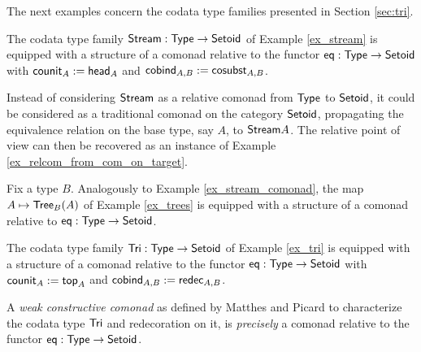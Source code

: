 \documentclass[a4paper,USenglish]{lipics}
\begin{document}
\noindent
The next examples concern the codata type families presented in Section \ref{sec:tri}.

\begin{example}[Streams]\label{ex_stream_comonad}
  The codata type family $\mathsf{Stream} : \mathsf{Type} \to \mathsf{Setoid}$ of Example \ref{ex_stream} is equipped with a structure of a comonad relative to the functor 
  $\mathsf{eq} : \mathsf{Type} \to \mathsf{Setoid}$ with
   $\mathsf{counit}_A := \mathsf{head}_A$ and
   $\mathsf{cobind}_{A,B} := \mathsf{cosubst}_{A,B}$.
\end{example}


\begin{rem}
 Instead of considering $\mathsf{Stream}$ as a relative comonad from $\mathsf{Type}$ to $\mathsf{Setoid}$, it could be considered as a traditional comonad on the 
 category $\mathsf{Setoid}$, propagating the equivalence relation on the base type, say $A$, to $\mathsf{Stream} A$.
 The relative point of view can then be recovered as an instance of Example \ref{ex_relcom_from_com_on_target}.
\end{rem}



\begin{example}[Trees]\label{ex_tree_comonad}
 Fix a type $B$. Analogously to Example \ref{ex_stream_comonad}, the map $A \mapsto \mathsf{Tree}_B(A)$ of Example \ref{ex_trees}
 is equipped with a structure of a comonad relative to $\mathsf{eq}: \mathsf{Type}\to\mathsf{Setoid}$.
\end{example}

\begin{example}\label{ex:tri_comonad}
  The codata type family $\mathsf{Tri} : \mathsf{Type} \to \mathsf{Setoid}$ of Example \ref{ex_tri} is equipped with a structure of a comonad relative to the functor 
  $\mathsf{eq} : \mathsf{Type} \to \mathsf{Setoid}$ with
   $\mathsf{counit}_A := \mathsf{top}_A$ and
   $\mathsf{cobind}_{A,B} := \mathsf{redec}_{A,B}$.
\end{example}


\begin{rem}
  A \emph{weak constructive comonad} as defined by Matthes and Picard \cite{DBLP:conf/types/MatthesP11} to characterize the codata type $\mathsf{Tri}$
  and redecoration on it, is \emph{precisely}
  a comonad relative to the functor $\mathsf{eq} : \mathsf{Type}\to\mathsf{Setoid}$.
\end{rem}
\end{document}
